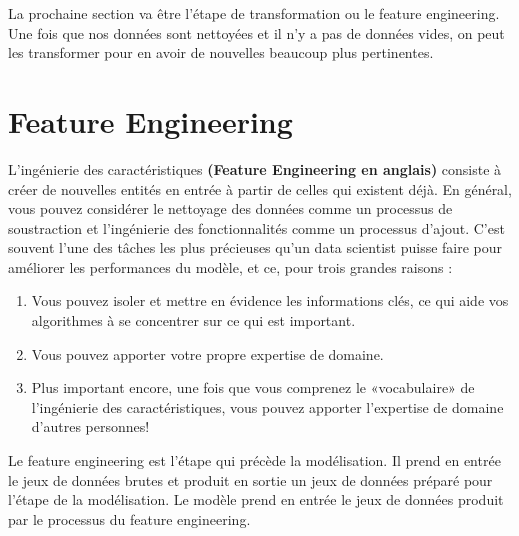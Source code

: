 \documentclass[12pt, french]{report}
\begin{document}
La prochaine section va être l'étape de transformation ou le feature engineering. Une fois que nos données sont nettoyées et il n'y a pas de données vides, on peut les transformer pour en avoir de nouvelles beaucoup plus pertinentes. 

\section{Feature Engineering}

L'ingénierie des caractéristiques \textbf{(Feature Engineering en anglais)} consiste à créer de nouvelles entités en entrée à partir de celles qui existent déjà. En général, vous pouvez considérer le nettoyage des données comme un processus de soustraction et l'ingénierie des fonctionnalités comme un processus d'ajout. C'est souvent l'une des tâches les plus précieuses qu'un data scientist puisse faire pour améliorer les performances du modèle, et ce, pour trois grandes raisons \cite{key22}:

\begin{enumerate}
\item Vous pouvez isoler et mettre en évidence les informations clés, ce qui aide vos algorithmes à se concentrer sur ce qui est important.
\item Vous pouvez apporter votre propre expertise de domaine.
\item Plus important encore, une fois que vous comprenez le «vocabulaire» de l'ingénierie des caractéristiques, vous pouvez apporter l'expertise de domaine d'autres personnes!
\end{enumerate}

Le feature engineering est l'étape qui précède la modélisation. Il prend en entrée le jeux de données brutes et produit en sortie un jeux de données préparé pour l'étape de la modélisation. Le modèle prend en entrée le jeux de données produit par le processus du feature engineering. \\ 
\end{document}
